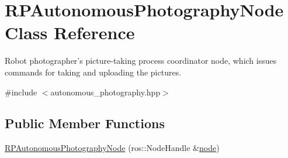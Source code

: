 \hypertarget{class_r_p_autonomous_photography_node}{\section{\-R\-P\-Autonomous\-Photography\-Node \-Class \-Reference}
\label{class_r_p_autonomous_photography_node}
}


\-Robot photographer's picture-\/taking process coordinator node, which issues commands for taking and uploading the pictures.  




{\ttfamily \#include $<$autonomous\-\_\-photography.\-hpp$>$}

\subsection*{\-Public \-Member \-Functions}
\begin{DoxyCompactItemize}
\item 
\hyperlink{class_r_p_autonomous_photography_node_a8b1c9845c2be288e7c19ac1bcb2a9e64}{\-R\-P\-Autonomous\-Photography\-Node} (ros\-::\-Node\-Handle \&\hyperlink{class_r_p_autonomous_photography_node_a76b5869d4c60b361445d78995569a0fa}{node})
\end{DoxyCompactItemize}
